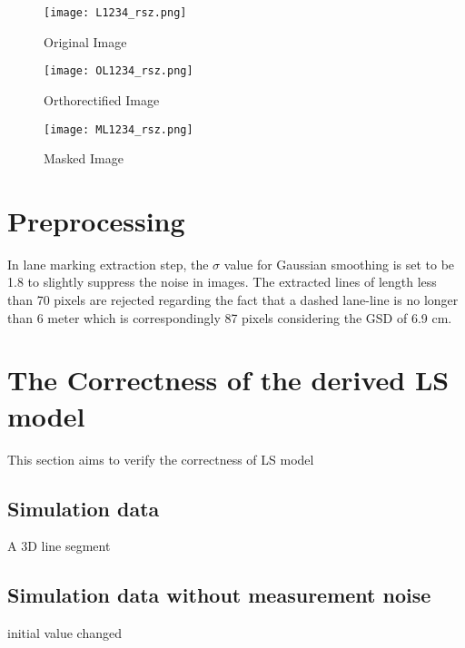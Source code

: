 \begin{figure}%
  \parbox{.475\linewidth}{
    \centering
    \texttt{[image: L1234\_rsz.png]}
    \caption{\small Original Image}
    \label{fig:OriImg}
  }
  \quad
  \parbox{.475\linewidth}{
    \centering
    \texttt{[image: OL1234\_rsz.png]}
    \caption{\small Orthorectified Image}
    \label{fig:OrthoImg}
  }
  \centering
  \parbox{.7\linewidth}{
    \texttt{[image: ML1234\_rsz.png]}
    \caption{\small Masked Image}
    \label{fig:MaskedImg}
  }
\end{figure}

\clearpage
\section{Preprocessing}
\label{sec:preprocessing}

In lane marking extraction step, the $\sigma$ value for Gaussian smoothing is set to be 1.8 %
to slightly suppress the noise in images.
The extracted lines of length less than 70 pixels are rejected %
regarding the fact that a dashed lane-line is no longer than 6 meter which is correspondingly 87 pixels considering the GSD of 6.9 cm.

\section{The Correctness of the derived LS model}
\label{sec:sd}
This section aims to verify the correctness of LS model

\subsection{Simulation data}
A 3D line segment 

\subsection{Simulation data without measurement noise}
initial value changed

